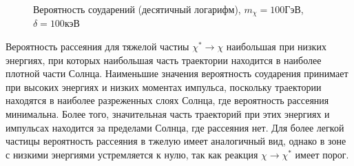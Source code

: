 \begin{figure}[!h]
\label{plot:C_LH_minus}
\caption{Вероятность соударений (десятичный логарифм), $m_{\chi} = 100 \text{ГэВ}$, $\delta = 100 \text{кэВ}$}
\end{figure}

Вероятность рассеяния для тяжелой частиы $\chi^* \rightarrow \chi$ наибольшая при низких энергиях, при которых наибольшая часть траектории находится в наиболее плотной части Солнца. Наименьшие значения вероятность соударения принимает при высоких энергиях и низких моментах импульса, поскольку траектории находятся в наиболее разреженных слоях Солнца, где вероятность рассеяния минимальна. Более того, значительная часть траекторий при этих энергиях и импульсах находится за пределами Солнца, где рассеяния нет.
Для более легкой частицы вероятность рассеяния в тжелую имеет аналогичный вид, однако в зоне с низкими энергиями устремляется к нулю, так как реакция $\chi \rightarrow \chi^*$ имеет порог.


